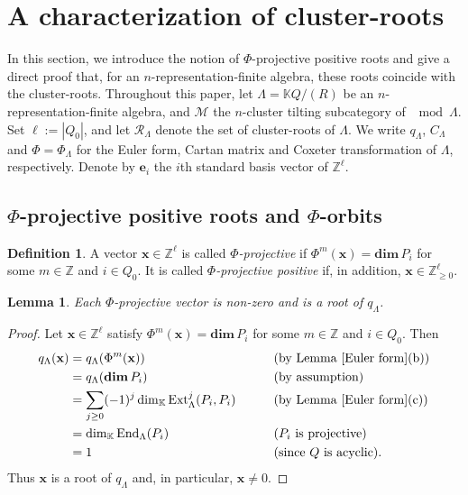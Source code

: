 \documentclass[11pt,a4paper]{amsart}
\newtheorem{lemma}[theorem]{Lemma}
\theoremstyle{definition}
\newtheorem{definition}[theorem]{Definition}
\numberwithin{equation}{section}
\newcommand{\Z}{\mathbb{Z}}
\newcommand{\x}{\mathbf{x}}
\newcommand{\0}{\mathbf{0}}
\newcommand{\dimv}{\mathbf{dim}\,}
\newcommand{\End}{\operatorname{End}\nolimits}
\newcommand{\Ext}{\operatorname{Ext}\nolimits}
\begin{document}
	\section{A characterization of cluster-roots}
	In this section, we introduce the notion of $\Phi$-projective positive roots
	and give a direct proof that, for an $n$-representation-finite
	algebra, these roots coincide with the cluster-roots. 	
	Throughout this paper, let $\Lambda=\mathbb{K}Q/(R)$ be an $n$-representation-finite algebra, 
	 and  $\mathcal{M}$ the $n$-cluster tilting subcategory of $\mod\Lambda$.
	Set $\ell:=|Q_0|$, and let $\mathcal{R}_\Lambda$ denote the set of
	cluster-roots of $\Lambda$. We write $q_\Lambda$, $C_\Lambda$ and
	$\Phi=\Phi_\Lambda$ for the Euler form, Cartan matrix and Coxeter
	transformation of $\Lambda$, respectively. Denote by $\mathbf{e}_i$ the $i$th standard basis vector of $\Z^{\ell}$.
	
	

	\subsection{$\Phi$-projective positive roots and $\Phi$-orbits}	
	
	\begin{definition} \label{projective positive} A vector $\x\in\Z^\ell$ is called \emph{$\Phi$-projective} if
		$\Phi^m(\x)=\dimv P_i$ for some $m\in\Z$ and $i\in Q_0$.
		It is called \emph{$\Phi$-projective positive} if, in addition,
		$\x\in\Z_{\ge0}^\ell$.
		\end{definition}	
	
	\begin{lemma} \label{Phi-projective vector is a root}
			Each $\Phi$-projective vector is non-zero and is a root of $q_{\Lambda}$.
	\end{lemma}
	\begin{proof} Let $\mathbf{x}\in\Z^\ell$ satisfy $	\Phi^m(\x)=\dimv P_i$ for some $m\in \Z$ and $ i\in Q_0$. Then 
			\begin{alignat*}{2}
			q_\Lambda(\x)
			&=q_\Lambda(\Phi^m(\x))
			&&\qquad\text{(by Lemma~\ref{Euler form}(b))}\\
			&=q_\Lambda(\dimv P_i)
			&&\qquad\text{(by assumption)}\\
			&=\sum_{j\geq0}(-1)^j
			\dim_{\mathbb K}\Ext^j_\Lambda(P_i,P_i)
			&&\qquad\text{(by Lemma~\ref{Euler form}(c))}\\
			&=\dim_{\mathbb K}\End_\Lambda(P_i)
			&&\qquad\text{($P_i$ is projective)}\\
			&=1
			&&\qquad\text{(since $Q$ is acyclic).}
		\end{alignat*}
		Thus $\x$ is a root of $q_\Lambda$ and, in particular,
		$\x\neq0$. 
	\end{proof}
	
\end{document}
